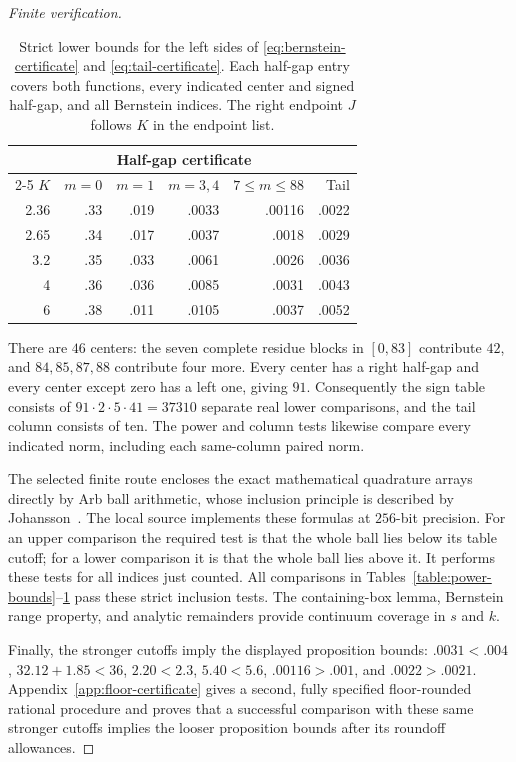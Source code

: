 \begin{proof}[Finite verification]
\begin{table}[tb]
\centering
\caption{Strict lower bounds for the left sides of
\eqref{eq:bernstein-certificate} and \eqref{eq:tail-certificate}.
Each half-gap entry covers both functions, every indicated center and signed
half-gap, and all Bernstein indices.  The right endpoint $J$ follows $K$ in
the endpoint list.}
\label{table:sign-bounds}
\begin{tabular}{@{}rrrrrr@{}}
\toprule
&\multicolumn{4}{c}{Half-gap certificate}&\\
\cmidrule(lr){2-5}
$K$&$m=0$&$m=1$&$m=3,4$&$7\le m\le88$&Tail\\
\midrule
2.36&.33&.019&.0033&.00116&.0022\\
2.65&.34&.017&.0037&.0018&.0029\\
3.2&.35&.033&.0061&.0026&.0036\\
4&.36&.036&.0085&.0031&.0043\\
6&.38&.011&.0105&.0037&.0052\\
\bottomrule
\end{tabular}
\end{table}

There are $46$ centers: the seven complete residue blocks in $[0,83]$
contribute $42$, and $84,85,87,88$ contribute four more.  Every center has
a right half-gap and every center except zero has a left one, giving $91$.
Consequently the sign table consists of $91\cdot2\cdot5\cdot41=37310$
separate real lower comparisons, and the tail column consists of ten.
The power and column tests likewise compare every indicated norm, including
each same-column paired norm.

The selected finite route encloses the exact mathematical quadrature arrays
directly by Arb ball arithmetic, whose inclusion principle is described by
Johansson~\citep{Johansson2017}.  The local source
 implements these formulas at $256$-bit
precision.  For an upper comparison the required test is that the whole ball
lies below its table cutoff; for a lower comparison it is that the whole ball
lies above it.  It performs these tests for all indices just counted.
All comparisons in Tables~\ref{table:power-bounds}--\ref{table:sign-bounds}
pass these strict inclusion tests.
The containing-box lemma, Bernstein range property, and analytic remainders
provide continuum coverage in $s$ and $k$.

Finally, the stronger cutoffs imply the displayed proposition bounds:
$.0031<.004$, $32.12+1.85<36$, $2.20<2.3$, $5.40<5.6$,
$.00116>.001$, and $.0022>.0021$.  Appendix~\ref{app:floor-certificate} gives a
second, fully specified floor-rounded rational procedure and proves that a
successful comparison with these same stronger cutoffs implies the looser
proposition bounds after its roundoff allowances.
\end{proof}
